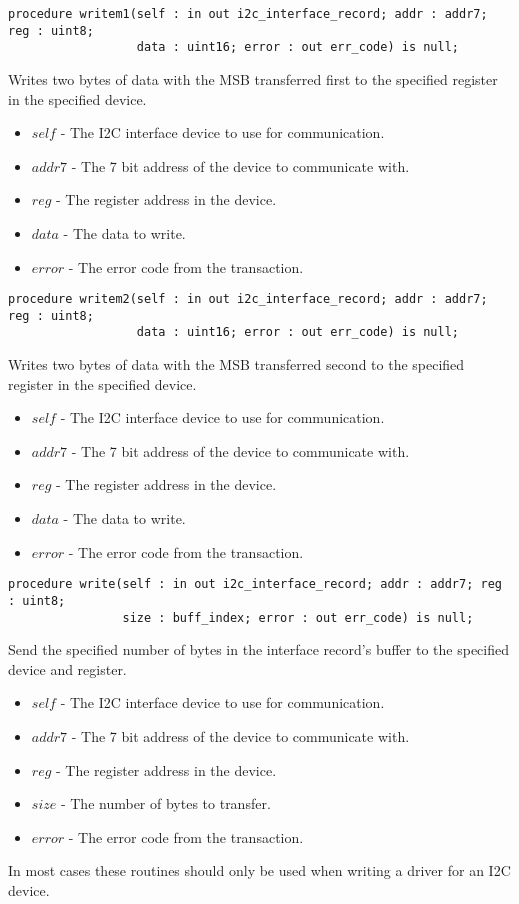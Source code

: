 \documentclass[10pt, openany]{book}
\newcommand{\indexfunc}[1]{\index[func]{#1}}
\begin{document}
\begin{lstlisting}
procedure writem1(self : in out i2c_interface_record; addr : addr7; reg : uint8;
                  data : uint16; error : out err_code) is null;
\end{lstlisting}
\indexfunc{writem1}
Writes two bytes of data with the MSB transferred first to the specified register in the specified device.
\begin{itemize}
  \item $self$ - The I2C interface device to use for communication.
  \item $addr7$ - The 7 bit address of the device to communicate with.
  \item $reg$ - The register address in the device.
  \item $data$ - The data to write.
  \item $error$ - The error code from the transaction.
\end{itemize}

\begin{lstlisting}
procedure writem2(self : in out i2c_interface_record; addr : addr7; reg : uint8;
                  data : uint16; error : out err_code) is null;
\end{lstlisting}
\indexfunc{writem2}
Writes two bytes of data with the MSB transferred second to the specified register in the specified device.
\begin{itemize}
  \item $self$ - The I2C interface device to use for communication.
  \item $addr7$ - The 7 bit address of the device to communicate with.
  \item $reg$ - The register address in the device.
  \item $data$ - The data to write.
  \item $error$ - The error code from the transaction.
\end{itemize}

\begin{lstlisting}
procedure write(self : in out i2c_interface_record; addr : addr7; reg : uint8;
                size : buff_index; error : out err_code) is null;
\end{lstlisting}
\indexfunc{write}
Send the specified number of bytes in the interface record's buffer to the specified device and register.
\begin{itemize}
  \item $self$ - The I2C interface device to use for communication.
  \item $addr7$ - The 7 bit address of the device to communicate with.
  \item $reg$ - The register address in the device.
  \item $size$ - The number of bytes to transfer.
  \item $error$ - The error code from the transaction.
\end{itemize}
In most cases these routines should only be used when writing a driver for an I2C device.
\end{document}
